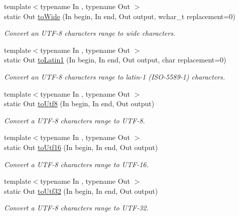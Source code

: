 \begin{DoxyCompactItemize}
{\footnotesize template$<$typename In , typename Out $>$ }\\static Out \hyperlink{classburn_1_1_utf_3_018_01_4_aa7754a362e01c11da578cad0c10fffad}{to\-Wide} (In begin, In end, Out output, wchar\-\_\-t replacement=0)
\begin{DoxyCompactList}\small\item\em Convert an U\-T\-F-\/8 characters range to wide characters. \end{DoxyCompactList}\item 
{\footnotesize template$<$typename In , typename Out $>$ }\\static Out \hyperlink{classburn_1_1_utf_3_018_01_4_ab59ea9e8cedd23d89cabb9f5802cf83d}{to\-Latin1} (In begin, In end, Out output, char replacement=0)
\begin{DoxyCompactList}\small\item\em Convert an U\-T\-F-\/8 characters range to latin-\/1 (I\-S\-O-\/5589-\/1) characters. \end{DoxyCompactList}\item 
{\footnotesize template$<$typename In , typename Out $>$ }\\static Out \hyperlink{classburn_1_1_utf_3_018_01_4_a71308e07c65f7a60a5da08a9100637f3}{to\-Utf8} (In begin, In end, Out output)
\begin{DoxyCompactList}\small\item\em Convert a U\-T\-F-\/8 characters range to U\-T\-F-\/8. \end{DoxyCompactList}\item 
{\footnotesize template$<$typename In , typename Out $>$ }\\static Out \hyperlink{classburn_1_1_utf_3_018_01_4_aa0ed8d473eca38acd502533dbcdce1cf}{to\-Utf16} (In begin, In end, Out output)
\begin{DoxyCompactList}\small\item\em Convert a U\-T\-F-\/8 characters range to U\-T\-F-\/16. \end{DoxyCompactList}\item 
{\footnotesize template$<$typename In , typename Out $>$ }\\static Out \hyperlink{classburn_1_1_utf_3_018_01_4_a074db07f7baecc85406e72b43df7fae0}{to\-Utf32} (In begin, In end, Out output)
\begin{DoxyCompactList}\small\item\em Convert a U\-T\-F-\/8 characters range to U\-T\-F-\/32. \end{DoxyCompactList}\end{DoxyCompactItemize}


